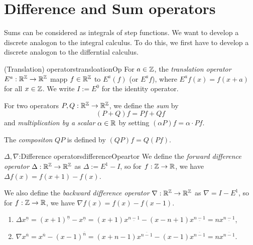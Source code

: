 \documentclass[language=english]{../../Template/TemplateLecture}
\begin{document}
\section{Difference and Sum operators}
Sums can be considered as integrals of step functions. We want to develop a discrete analogon to the integral calculus. To do this, we first have to develop a discrete analogon to the differntial calculus.

\begin{defi}{(Translation) operators}{transloationOp}
    For $a \in \mathbb{Z}$, the \emph{translation operator} $E^a: \mathbb{R}^{\mathbb{Z}} \to \mathbb{R}^{\mathbb{Z}}$ mapp $f \in \mathbb{R}^{\mathbb{Z}}$ to $E^a(f)$ (or $E^a f$), where $E^a f(x) = f(x + a)$ for all $x \in \mathbb{Z}$. We write $I := E^0$ for the identity operator.

    For two operators $P, Q: \mathbb{R}^{\mathbb{Z}} \to \mathbb{R}^{\mathbb{Z}}$, we define the \emph{sum} by 
    \begin{equation}
        (P + Q)f = Pf + Qf
    \end{equation}
    and \emph{multiplication by a scalar $\alpha \in \mathbb{R}$} by setting $(\alpha P)f = \alpha \cdot Pf$.

    The \emph{compositon} $QP$ is defined by $(QP)f = Q(Pf)$.
\end{defi}
\begin{defi}{$\Delta, \nabla$:Difference operators}{differenceOpeartor}
    We define the \emph{forward difference operator}\index{$\Delta$} $\Delta: \mathbb{R}^{\mathbb{Z}} \to \mathbb{R}^{\mathbb{Z}}$ as $\Delta := E^1 - I$, so for $f: \mathbb{Z} \to \mathbb{R}$, we have $\Delta f(x) = f(x + 1) - f(x)$. 
    
    We also define the \emph{backward difference operator}\index{$\nabla$} $\nabla: \mathbb{R}^{\mathbb{Z}} \to \mathbb{R}^{\mathbb{Z}}$ as $\nabla = I - E^1$, so for $f: \mathbb{Z} \to \mathbb{R}$, we have $\nabla f(x) = f(x) - f(x - 1)$.
\end{defi}

\begin{beispiel}
    \begin{enumerate}[$(i)$]
        \item $\Delta x^{\underline{n}} = (x+1)^{\underline{n}} - x^{\underline{n}} = (x+1) x^{\underline{n-1}} - (x - n + 1)x^{\underline{n-1}} = nx^{\underline{n-1}}$,
        \item $\nabla x^{\overline{n}} = x^{\overline{n}} - (x-1)^{\overline{n}} = (x + n - 1)x^{\overline{n-1}} - (x-1)x^{\overline{n-1}} = nx^{\overline{n-1}}$.
    \end{enumerate}
\end{beispiel}
\end{document}
